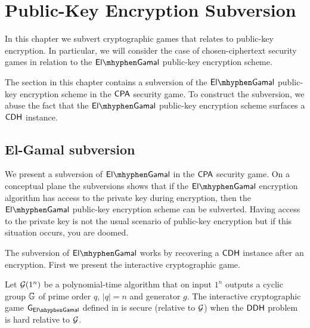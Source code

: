 \chapter{Public-Key Encryption Subversion}

In this chapter we subvert cryptographic games that relates to public-key encryption. In particular, we will consider the case of chosen-ciphertext security games in relation to the $\elGamal$ public-key encryption scheme. 

The section in this chapter contains a subversion of the $\elGamal$ public-key encryption scheme in the $\mathsf{CPA}$ security game. To construct the subversion, we abuse the fact that the $\elGamal$ public-key encryption scheme surfaces a $\mathsf{CDH}$ instance. 

\begin{comment}
the first section, we construct a subversion of the $\elGamal$ encryption scheme in the $\CPA$ security game. In the last section, we elaborate on the idea used and construct a general subversion for public-key encryptions schemes that (informally) surfaces a $\CDH$ instance. 
\end{comment}

\section{El-Gamal subversion}

We present a subversion of $\elGamal$ in the $\mathsf{CPA}$ security game. On a conceptual plane the subversions shows that if the $\elGamal$ encryption algorithm has access to the private key during encryption, then the $\elGamal$ public-key encryption scheme can be subverted. Having access to the private key is not the usual scenario of public-key encryption but if this situation occurs, you are doomed. 

The subversion of $\elGamal$ works by recovering a $\mathsf{CDH}$ instance after an encryption. First we present the interactive cryptographic game.

\begin{thm}
	Let $\operatorname{\mathcal{G}}(1^n)$ be a polynomial-time algorithm that on input $1^n$ outputs a cyclic group $\mathbb{G}$ of prime order $q$, $\vert q\vert = n$ and generator $g$. The interactive cryptographic game $\cgame_{\elGamal}$ defined in  is secure (relative to $\operatorname{\mathcal{G}}$) when the $\mathsf{DDH}$ problem is hard relative to $\operatorname{\mathcal{G}}$. 
\end{thm}

